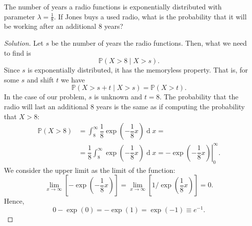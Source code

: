 \documentclass{article}[12pt]
\newenvironment{solution}
  {\renewcommand\qedsymbol{$\blacksquare$}\begin{proof}[Solution]}
  {\end{proof}}
\newenvironment{problem}[1]
  {\renewcommand\theinnercustomprblm{#1}\innercustomprblm}
  {\endinnercustomprblm}
\DeclareMathOperator{\dif}{d}
\renewcommand{\P}{\mathbb{P}}
\begin{document}
\begin{problem}{5.33}\normalfont
The number of years a radio functions is exponentially distributed with parameter $\lambda = \tfrac{1}{8}$. 
If Jones buys a used radio, what is the probability that it will be working after an additional $8$ years?
\end{problem}
\begin{solution}
Let $s$ be the number of years the radio functions.
Then, what we need to find is
\begin{equation*}
    \P(X > 8\mid X > s).
\end{equation*}
Since $s$ is exponentially distributed, it has the memoryless property.
That is, for some $s$ and shift $t$ we have
\begin{equation*}
    \P(X > s + t\mid X > s) = \P(X > t).
\end{equation*}
In the case of our problem, $s$ is unknown and $t = 8$.
The probability that the radio will last an additional $8$ years is the same as if computing
the probability that $X > 8$:
\begin{align*}
    \P(X > 8) &= \int_{8}^{\infty}\dfrac{1}{8}\exp\left(-\dfrac{1}{8}x\right)\dif x =
    \\
    &= \dfrac{1}{8}\int_{8}^{\infty}\exp\left(-\dfrac{1}{8}x\right)\dif x = -\left.\exp\left(-\dfrac{1}{8}x\right)\right|_{0}^{\infty}.
\end{align*}
We consider the upper limit as the limit of the function:
\begin{equation*}
    \lim_{x\to\infty}\left[-\exp\left(-\dfrac{1}{8}x\right)\right] = \lim_{x\to\infty}\left[1\bigg/\exp\left(\dfrac{1}{8}x\right)\right] = 0.
\end{equation*}
Hence,
\begin{equation*}
    0 - \exp(0) = -\exp(1) = \exp(-1) \equiv e^{-1}.
\end{equation*}
\end{solution}
\end{document}
